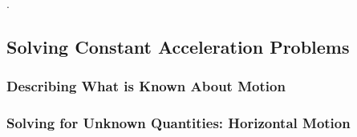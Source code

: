\documentclass[../main-physics-problems.tex]{subfiles}
\begin{document}
\begin{questions}
\question
.
\end{questions}

\subsection{Solving Constant Acceleration Problems}

\subsubsection{Describing What is Known About Motion}

\clearpage

\subsubsection{Solving for Unknown Quantities: Horizontal Motion}
\end{document}
